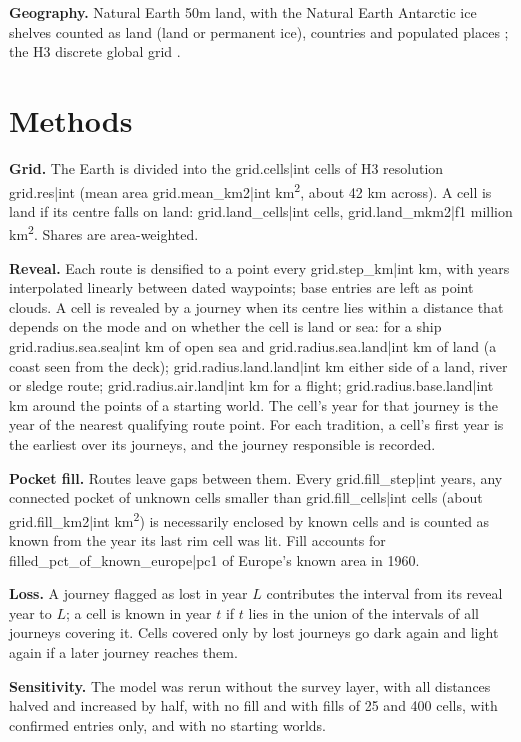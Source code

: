 \documentclass[11pt,a4paper]{article}
\begin{document}
\textbf{Geography.} Natural Earth 50m land, with the Natural Earth Antarctic ice shelves counted as land (land or permanent ice), countries and populated places \citep{naturalearth}; the H3 discrete global grid \citep{h3}.

\section{Methods}
\textbf{Grid.} The Earth is divided into the {{grid.cells|int}} cells of H3 resolution {{grid.res|int}} (mean area {{grid.mean_km2|int}} km\textsuperscript{2}, about 42 km across). A cell is land if its centre falls on land: {{grid.land_cells|int}} cells, {{grid.land_mkm2|f1}} million km\textsuperscript{2}. Shares are area-weighted.

\textbf{Reveal.} Each route is densified to a point every {{grid.step_km|int}} km, with years interpolated linearly between dated waypoints; base entries are left as point clouds. A cell is revealed by a journey when its centre lies within a distance that depends on the mode and on whether the cell is land or sea: for a ship {{grid.radius.sea.sea|int}} km of open sea and {{grid.radius.sea.land|int}} km of land (a coast seen from the deck); {{grid.radius.land.land|int}} km either side of a land, river or sledge route; {{grid.radius.air.land|int}} km for a flight; {{grid.radius.base.land|int}} km around the points of a starting world. The cell's year for that journey is the year of the nearest qualifying route point. For each tradition, a cell's first year is the earliest over its journeys, and the journey responsible is recorded.

\textbf{Pocket fill.} Routes leave gaps between them. Every {{grid.fill_step|int}} years, any connected pocket of unknown cells smaller than {{grid.fill_cells|int}} cells (about {{grid.fill_km2|int}} km\textsuperscript{2}) is necessarily enclosed by known cells and is counted as known from the year its last rim cell was lit. Fill accounts for {{filled_pct_of_known_europe|pc1}} of Europe's known area in 1960.

\textbf{Loss.} A journey flagged as lost in year $L$ contributes the interval from its reveal year to $L$; a cell is known in year $t$ if $t$ lies in the union of the intervals of all journeys covering it. Cells covered only by lost journeys go dark again and light again if a later journey reaches them.

\textbf{Sensitivity.} The model was rerun without the survey layer, with all distances halved and increased by half, with no fill and with fills of 25 and 400 cells, with confirmed entries only, and with no starting worlds.
\end{document}
